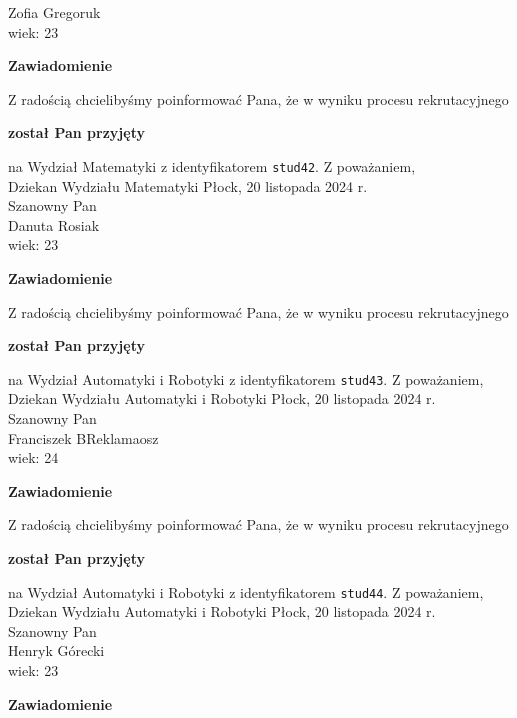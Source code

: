 \documentclass[12pt,a4paper]{article}
\begin{document}
Zofia Gregoruk \\
wiek: 23
\bigskip
\begin{center}
 	{\Large\textbf{Zawiadomienie}}
\end{center}
\bigskip
Z radością chcielibyśmy poinformować Pana, że w wyniku procesu rekrutacyjnego 
\begin{center}
\textsf{\textbf{został Pan przyjęty}} 
\end{center}
na Wydział Matematyki z identyfikatorem \verb|stud42|. 
\vspace{2cm}
\noindent
Z poważaniem,\\
Dziekan
Wydziału Matematyki
\newpage
\hfill Płock, 20 listopada 2024 r.\\
\noindent 
Szanowny Pan \\
Danuta Rosiak \\
wiek: 23
\bigskip
\begin{center}
 	{\Large\textbf{Zawiadomienie}}
\end{center}
\bigskip
Z radością chcielibyśmy poinformować Pana, że w wyniku procesu rekrutacyjnego 
\begin{center}
\textsf{\textbf{został Pan przyjęty}} 
\end{center}
na Wydział Automatyki i Robotyki z identyfikatorem \verb|stud43|. 
\vspace{2cm}
\noindent
Z poważaniem,\\
Dziekan
Wydziału Automatyki i Robotyki
\newpage
\hfill Płock, 20 listopada 2024 r.\\
\noindent 
Szanowny Pan \\
Franciszek BReklamaosz \\
wiek: 24
\bigskip
\begin{center}
 	{\Large\textbf{Zawiadomienie}}
\end{center}
\bigskip
Z radością chcielibyśmy poinformować Pana, że w wyniku procesu rekrutacyjnego 
\begin{center}
\textsf{\textbf{został Pan przyjęty}} 
\end{center}
na Wydział Automatyki i Robotyki z identyfikatorem \verb|stud44|. 
\vspace{2cm}
\noindent
Z poważaniem,\\
Dziekan
Wydziału Automatyki i Robotyki
\newpage
\hfill Płock, 20 listopada 2024 r.\\
\noindent 
Szanowny Pan \\
Henryk Górecki \\
wiek: 23
\bigskip
\begin{center}
 	{\Large\textbf{Zawiadomienie}}
\end{center}
\end{document}

